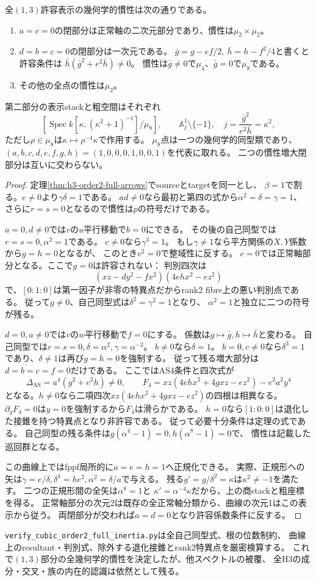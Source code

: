 \begin{theorem}\label{thm:h3-order2-full-inertia}
全$(1,3)$許容表示の幾何学的慣性は次の通りである。
\begin{enumerate}
\item $a=c=0$の閉部分は正常軸の二次元部分であり、慣性は$\mu_2\times\mu_2$。
\item $d=b=c=0$の閉部分は一次元である。
 $\bar g=g-ef/2,\ \bar h=h-f^2/4$と書くと許容条件は
 $\bar h(\bar g^2+e^2\bar h)\ne0$。
 慣性は$\bar g\ne0$で$\mu_4$、$\bar g=0$で$\mu_8$である。
\item その他の全点の慣性は$\mu_2$。
\end{enumerate}
第二部分の表示stackと粗空間はそれぞれ
\[
 [\operatorname{Spec}k[\kappa,(\kappa^2+1)^{-1}]/\mu_8],
 \qquad\mathbb A^1_j\setminus\{-1\},\quad
 j=\frac{\bar g^2}{e^2\bar h}=\kappa^2,
\]
ただし$\rho\in\mu_8$は$\kappa\mapsto\rho^{-4}\kappa$で作用する。
$\mu_8$点は一つの幾何学的同型類であり、
$(a,b,c,d,e,f,g,h)=(1,0,0,0,1,0,0,1)$を代表に取れる。
二つの慣性増大閉部分は互いに交わらない。
\end{theorem}
\begin{proof}
定理\ref{thm:h3-order2-full-arrows}でsourceとtargetを同一とし、
$\beta=1$で割る。$e\ne0$より$\gamma\delta=1$である。
$ad\ne0$なら最初と第四の式から$\alpha^2=\delta=\gamma=1$、
さらに$r=s=0$となるので慣性は$p$の符号だけである。

$a=0,d\ne0$では$v$の$u$平行移動で$b=0$にできる。
その後の自己同型では$r=s=0,\alpha^2=1$である。
$c\ne0$なら$\gamma^3=1$。
もし$\gamma\ne1$なら平方関係の$X,Y$係数から$g=h=0$となるが、
このとき$v^2=0$で整域性に反する。
$c=0$では正常軸部分となる。ここで$g=0$は許容されない：
判別四次は
\[
 (xz-dy^2-fx^2)(4ehx^2-ez^2)
\]
で、$[0:1:0]$は第一因子が非零の特異点だからrank2 fibre上の悪い判別点である。
従って$g\ne0$、自己同型式は$\delta^2=\gamma^2=1$となり、
$\alpha^2=1$と独立に二つの符号が残る。

$d=0,a\ne0$では$v$の$w$平行移動で$f=0$にする。
係数は$g\mapsto\bar g,h\mapsto\bar h$と変わる。
自己同型では$r=s=0,\delta=\alpha^2,\gamma=\alpha^{-2}$。
$b\ne0$なら$\delta=1$。
$b=0,c\ne0$なら$\delta^3=1$であり、$\delta\ne1$は再び$g=h=0$を強制する。
従って残る増大部分は$d=b=c=f=0$だけである。
ここではAS4条件と四次式が
\[
 \Delta_{\mathrm{AS}}=a^4(g^2+e^2h)\ne0,\qquad
 F_4=xz(4ehx^2+4gxz-ez^2)-e^2a^2y^4
\]
となる。$h\ne0$なら二項四次$xz(4ehx^2+4gxz-ez^2)$の四根は相異なる。
$\partial_yF_4=0$は$y=0$を強制するから$F_4$は滑らかである。
$h=0$なら$[1:0:0]$は退化した接錐を持つ特異点となり非許容である。
従って必要十分条件は定理の式である。
自己同型の残る条件は$g(\alpha^4-1)=0,h(\alpha^8-1)=0$で、
慣性は記載した巡回群となる。

この曲線上ではfppf局所的に$a=e=h=1$へ正規化できる。
実際、正規形への矢は$\gamma=e/\delta,\delta^4=he^2,\alpha^2=\delta/a$で与える。
残る$g'=g/\delta^2=\kappa$は$\kappa^2\ne-1$を満たす。
二つの正規形間の全矢は$\alpha^8=1$と
$\kappa'=\alpha^{-4}\kappa$だから、上の商stackと粗座標を得る。
正常軸部分の次元2は既存の全正常軸分類から、曲線の次元1はこの表示から従う。
両閉部分が交われば$a=d=0$となり許容係数条件に反する。
\end{proof}

\texttt{verify\_cubic\_order2\_full\_inertia.py}は全自己同型式、根の位数制約、
曲線上のresultant・判別式、除外する退化接錐とrank2特異点を厳密検算する。
これで$(1,3)$部分の全幾何学的慣性を決定したが、他スペクトルの被覆、
全H3の成分・交叉・族の内在的認識は依然として残る。
